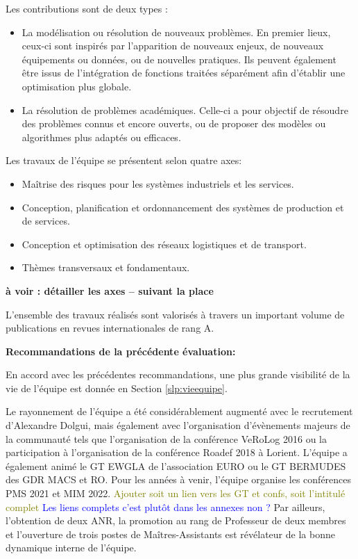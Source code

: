 Les contributions sont de deux types : 
\begin{itemize}
\item La modélisation ou résolution de nouveaux problèmes. En premier lieux, ceux-ci sont  inspirés par l'apparition de nouveaux enjeux, de nouveaux équipements ou données, ou de nouvelles pratiques. 
Ils peuvent également être issus de l'intégration de fonctions traitées séparément afin d'établir une optimisation plus globale. 
\item La résolution de problèmes académiques. Celle-ci a pour objectif de résoudre des problèmes connus et encore ouverts, ou de proposer des modèles ou algorithmes plus adaptés ou efficaces.
\end{itemize}

Les travaux de l'équipe se présentent selon quatre axes:
\begin{itemize}
    \item Maîtrise des risques pour les systèmes industriels et les services.
    \item Conception, planification et ordonnancement des systèmes de production et de services.
    \item Conception et optimisation des réseaux logistiques et de transport.
    \item Thèmes transversaux et fondamentaux.
\end{itemize}

\textbf{à voir : détailler les axes -- suivant la place}

L'ensemble des travaux réalisés sont valorisés à travers un important volume de publications en revues internationales de rang A.


\textbf{Recommandations de la précédente évaluation:}

En accord avec les précédentes recommandations, une plus grande visibilité de la vie de l'équipe est donnée en Section \ref{slp:vieequipe}.

Le rayonnement de l'équipe a été considérablement augmenté avec le recrutement d'Alexandre Dolgui, mais également avec l'organisation d'évènements majeurs de la communauté tels que l'organisation de la conférence VeRoLog 2016 ou la participation à l'organisation de la conférence Roadef 2018 à Lorient. 
L'équipe a également animé le GT EWGLA de l'association EURO ou le GT BERMUDES des GDR MACS et RO.
Pour les années à venir, l'équipe organise les conférences PMS 2021 et MIM 2022.
\textcolor{olive}{Ajouter soit un lien vers les GT et confs, soit l'intitulé complet}
\textcolor{blue}{Les liens complets c'est plutôt dans les annexes non ?}
Par ailleurs, l'obtention de deux ANR, la promotion au rang de Professeur de deux membres et l'ouverture de trois postes de Maîtres-Assistants est révélateur de la bonne dynamique interne de l'équipe.

